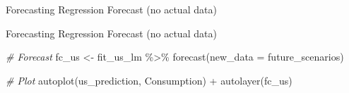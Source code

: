 \documentclass[
  ignorenonframetext,
]{beamer}
\newenvironment{Shaded}{\begin{snugshade}}{\end{snugshade}}
\newcommand{\AttributeTok}[1]{\textcolor[rgb]{0.77,0.63,0.00}{#1}}
\newcommand{\CommentTok}[1]{\textcolor[rgb]{0.56,0.35,0.01}{\textit{#1}}}
\newcommand{\DecValTok}[1]{\textcolor[rgb]{0.00,0.00,0.81}{#1}}
\newcommand{\FunctionTok}[1]{\textcolor[rgb]{0.00,0.00,0.00}{#1}}
\newcommand{\NormalTok}[1]{#1}
\newcommand{\OtherTok}[1]{\textcolor[rgb]{0.56,0.35,0.01}{#1}}
\newcommand{\SpecialCharTok}[1]{\textcolor[rgb]{0.00,0.00,0.00}{#1}}
\begin{document}
\begin{frame}[fragile]{Forecasting \textbar{} \small Regression Forecast
(no actual data)}
\begin{Shaded}
\end{Shaded}

\normalfont
\end{frame}

\begin{frame}[fragile]{Forecasting \textbar{} \small Regression Forecast
(no actual data)}
\protect\hypertarget{forecasting-regression-forecast-no-actual-data-1}{}
\normalfont

\normalfont

\normalfont

\begin{Shaded}
\begin{Highlighting}[]
\CommentTok{\# Forecast}
\NormalTok{fc\_us }\OtherTok{\textless{}{-}}\NormalTok{ fit\_us\_lm }\SpecialCharTok{\%\textgreater{}\%} 
  \FunctionTok{forecast}\NormalTok{(}\AttributeTok{new\_data =}\NormalTok{ future\_scenarios)}

\CommentTok{\# Plot}
\FunctionTok{autoplot}\NormalTok{(us\_prediction, Consumption) }\SpecialCharTok{+}
  \FunctionTok{autolayer}\NormalTok{(fc\_us)}
\end{Highlighting}
\end{Shaded}

\normalfont
\end{frame}
\end{document}
